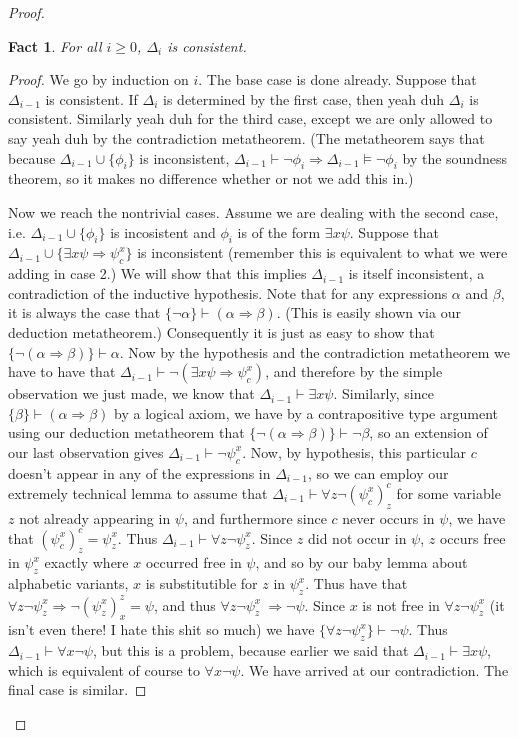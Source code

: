 \documentclass{article}
\theoremstyle{definition}
\theoremstyle{plain}
\theoremstyle{theorem}
\newtheorem{fact}{Fact}[section]
\begin{document}
\begin{proof}
    \begin{fact}
        For all $i \geq 0$, $\Delta_i$ is consistent.
    \end{fact}
    \begin{proof}
        We go by induction on $i$. The base case is done already. Suppose that $\Delta_{i-1}$ is consistent. If $\Delta_i$ is determined by the first case, then yeah duh $\Delta_i$ is consistent. Similarly yeah duh for the third case, except we are only allowed to say yeah duh by the contradiction metatheorem. (The metatheorem says that because $\Delta_{i-1} \cup \{\phi_i\}$ is inconsistent, $\Delta_{i-1} \vdash \neg \phi_i \Rightarrow \Delta_{i-1} \models \neg \phi_i$ by the soundness theorem, so it makes no difference whether or not we add this in.)
        \par Now we reach the nontrivial cases. Assume we are dealing with the second case, i.e. $\Delta_{i-1} \cup \{\phi_i\}$ is incosistent and $\phi_i$ is of the form $\exists x \psi$. Suppose that $\Delta_{i-1} \cup \{\exists x \psi \Rightarrow \psi_c^x\}$ is inconsistent (remember this is equivalent to what we were adding in case 2.) We will show that this implies $\Delta_{i-1}$ is itself inconsistent, a contradiction of the inductive hypothesis. Note that for any expressions $\alpha$ and $\beta$, it is always the case that $\{\neg \alpha\} \vdash (\alpha \Rightarrow \beta)$. (This is easily shown via our deduction metatheorem.) Consequently it is just as easy to show that $\{\neg(\alpha \Rightarrow \beta)\} \vdash \alpha$. Now by the hypothesis and the contradiction metatheorem we have to have that $\Delta_{i-1} \vdash \neg (\exists x \psi \Rightarrow \psi_c^x)$, and therefore by the simple observation we just made, we know that $\Delta_{i-1} \vdash \exists x \psi$. Similarly, since $\{\beta\} \vdash (\alpha \Rightarrow \beta)$ by a logical axiom, we have by a contrapositive type argument using our deduction metatheorem that $\{\neg(\alpha \Rightarrow \beta)\} \vdash \neg \beta$, so an extension of our last observation gives $\Delta_{i-1} \vdash \neg \psi_c^x$. Now, by hypothesis, this particular $c$ doesn't appear in any of the expressions in $\Delta_{i-1}$, so we can employ our extremely technical lemma to assume that $\Delta_{i-1} \vdash \forall z \neg (\psi_c^x)_z^c$ for some variable $z$ not already appearing in $\psi$, and furthermore since $c$ never occurs in $\psi$, we have that $(\psi_c^x)_z^c = \psi_z^x$. Thus $\Delta_{i-1} \vdash \forall z\neg \psi_z^x$. Since $z$ did not occur in $\psi$, $z$ occurs free in $\psi_z^x$ exactly where $x$ occurred free in $\psi$, and so by our baby lemma about alphabetic variants, $x$ is substitutible for $z$ in $\psi_z^x$. Thus have that $\forall z \neg \psi_z^x \Rightarrow \neg (\psi_z^x)_x^z = \psi$, and thus $\forall z \neg \psi_z^x\ \Rightarrow \neg \psi$. Since $x$ is not free in $\forall z \neg \psi_z^x$ (it isn't even there! I hate this shit so much) we have $\{\forall z \neg \psi_z^x\} \vdash \neg \psi$. Thus $\Delta_{i-1} \vdash \forall x \neg \psi$, but this is a problem, because earlier we said that $\Delta_{i-1} \vdash \exists x \psi$, which is equivalent of course to $\forall x \neg \psi$. We have arrived at our contradiction. The final case is similar. 

\end{proof}
\end{proof}
\end{document}

